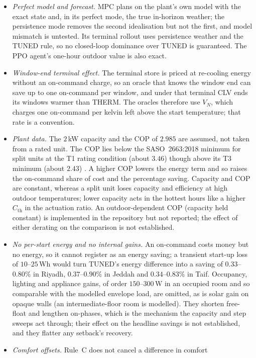 \documentclass[pdflatex,sn-mathphys-num,iicol]{sn-jnl}
\theoremstyle{thmstyleone}\newtheorem{proposition}{Proposition}\newtheorem{corollary}{Corollary}
\theoremstyle{thmstyletwo}\newtheorem{remark}{Remark}\newtheorem{observation}{Observation}
\theoremstyle{thmstylethree}\newtheorem{definition}{Definition}
\newcommand{\Cth}{C_{\mathrm{th}}}
\begin{document}
\begin{itemize}[leftmargin=*,itemsep=1pt,topsep=2pt]
\item \emph{Perfect model and forecast.} MPC plans
on the plant's own model with the exact state and, in its perfect mode, the true in-horizon weather; the persistence mode removes the second idealisation but not the first, and model mismatch is untested. Its terminal rollout uses persistence weather and the TUNED rule, so no closed-loop dominance over TUNED is guaranteed. The PPO agent's one-hour outdoor value is also exact.
\item \emph{Window-end terminal effect.} The terminal store is priced at
re-cooling energy without an on-command charge, so an oracle that knows the window end can save up to one on-command per window, and under that terminal CLV ends its windows warmer than THERM. The oracles therefore use $V_N$, which charges one on-command per kelvin left above the start temperature; that rate is a convention.
\item \emph{Plant data.} The $2\,$kW capacity and the COP of $2.985$ are
assumed, not taken from a rated unit. The COP lies below the SASO~2663:2018 minimum for split units at the T1 rating condition (about $3.46$) though above its T3 minimum (about $2.43$) \citep{SASO2663}. A higher COP lowers the energy term and so raises the on-command share of cost and the percentage saving. Capacity and COP are constant, whereas a split unit loses capacity and efficiency at high outdoor temperatures; lower capacity acts in the hottest hours like a higher $\Cth$ in the actuation ratio. An outdoor-dependent COP (capacity held constant) is implemented in the repository but not reported; the effect of either derating on the comparison is not established.
\item \emph{No per-start energy and no internal gains.} An on-command costs
money but no energy, so it cannot register as an energy saving; a transient start-up loss of $10$--$25\,$Wh would turn TUNED's energy difference into a saving of $0.33$--$0.80\%$ in Riyadh, $0.37$--$0.90\%$ in Jeddah and $0.34$--$0.83\%$ in Taif. Occupancy, lighting and appliance gains, of order $150$--$300\,$W in an occupied room and so comparable with the modelled envelope load, are omitted, as is solar gain on opaque walls (an intermediate-floor room is modelled). They shorten free-float and lengthen on-phases, which is the mechanism the capacity and step sweeps act through; their effect on the headline savings is not established, and they flatter any setback's recovery.
\item \emph{Comfort offsets.} Rule~C does not cancel a difference in comfort

\end{itemize}
\end{document}
